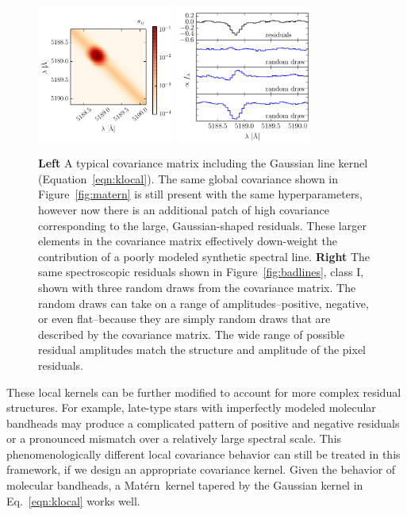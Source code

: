 \documentclass[iop,floatfix]{emulateapj}
\newcommand{\matern}{Mat\'{e}rn}
\begin{document}
\begin{figure}[!t]
\begin{center}
\includegraphics[width=0.4\textwidth]{figs/gauss_matrix.pdf}
\includegraphics[width=0.4\textwidth]{figs/gauss_draw.pdf}
\caption{\textbf{Left} A typical covariance matrix including the Gaussian line kernel (Equation~\ref{eqn:klocal}). The same global covariance shown in Figure~\ref{fig:matern} is still present with the same hyperparameters, however now there is an additional patch of high covariance corresponding to the large, Gaussian-shaped residuals. These larger elements in the covariance matrix effectively down-weight the contribution of a poorly modeled synthetic spectral line.
\textbf{Right} The same spectroscopic residuals shown in Figure~\ref{fig:badlines}, class I, shown with three random draws from the covariance matrix. The random draws can take on a range of amplitudes--positive, negative, or even flat--because they are simply random draws that are described by the covariance matrix. The wide range of possible residual amplitudes match the structure and amplitude of the pixel residuals.}
\label{fig:region}
\end{center}
\end{figure}

These local kernels can be further modified to account for more complex residual structures.  For 
example, late-type stars with imperfectly modeled molecular bandheads may produce a complicated 
pattern of positive and negative residuals or a pronounced mismatch over a relatively large 
spectral scale.  This phenomenologically different local covariance behavior can still be treated 
in this framework, if we design an appropriate covariance kernel. Given the behavior of molecular bandheads, a \matern\ kernel tapered by the Gaussian kernel in Eq.~\ref{eqn:klocal} works well.
\end{document}
